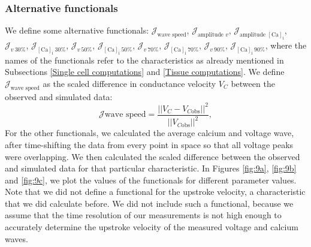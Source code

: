 \documentclass{article}
\begin{document}
\subsubsection{Alternative functionals} \label{Alternative functionals}
We define some alternative functionals: $\mathcal{J}_{\text{wave speed}}$, $\mathcal{J}_{\text{amplitude $v$}}$, $\mathcal{J}_{\text{amplitude $[\mathrm{Ca}]_{\mathrm{i}}$}}$, $\mathcal{J}_{v \:30 \%}$,
$\mathcal{J}_{[\mathrm{Ca}]_{\mathrm{i}} \:30 \%}$, $\mathcal{J}_{v \:50 \%}$,
$\mathcal{J}_{[\mathrm{Ca}]_{\mathrm{i}} \:50 \%}$,  $\mathcal{J}_{v \:70 \%}$,
$\mathcal{J}_{[\mathrm{Ca}]_{\mathrm{i}} \:70 \%}$,  $\mathcal{J}_{v \:90 \%}$,
$\mathcal{J}_{[\mathrm{Ca}]_{\mathrm{i}} \:90 \%}$, where the names of the functionals refer to the characteristics as already mentioned in Subsections \ref{Single cell computations} and \ref{Tissue computations}. We define $\mathcal{J}_{\text{wave speed}}$ as the scaled difference in conductance velocity $V_C$ between the observed and simulated data:
\begin{equation}
\mathcal{J}{\text{wave speed}} =  \frac{||V_C-V_{C \text{obs}}||^2}{||V_{C\text{obs}}||^2},\label{J_C}
\end{equation}
For the other functionals, we calculated the average calcium and voltage wave, after time-shifting the data from every point in space so that all voltage peaks were overlapping. We then calculated the scaled difference between the observed and simulated data for that particular characteristic. In Figures \ref{fig:9a}, \ref{fig:9b} and \ref{fig:9c}, we plot the values of the functionals for different parameter values. Note that we did not define a functional for the upstroke velocity, a characteristic that we did calculate before. We did not include such a functional, because we assume that the time resolution of our measurements is not high enough to accurately determine the upstroke velocity of the measured voltage and calcium waves.
\end{document}
